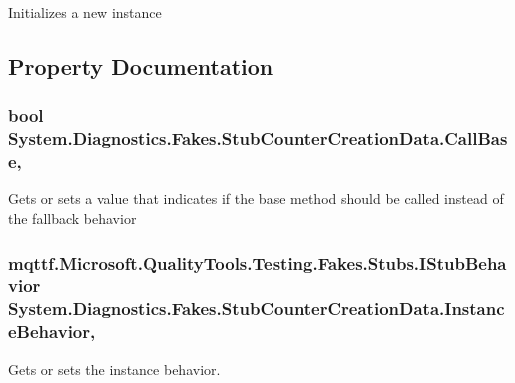 Initializes a new instance



\subsection{Property Documentation}
\hypertarget{class_system_1_1_diagnostics_1_1_fakes_1_1_stub_counter_creation_data_a24df646b543562717fc69981645f8bed}{
\subsubsection[{Call\-Base}]{\setlength{\rightskip}{0pt plus 5cm}bool System.\-Diagnostics.\-Fakes.\-Stub\-Counter\-Creation\-Data.\-Call\-Base\hspace{0.3cm}{\ttfamily [get]}, {\ttfamily [set]}}}\label{class_system_1_1_diagnostics_1_1_fakes_1_1_stub_counter_creation_data_a24df646b543562717fc69981645f8bed}


Gets or sets a value that indicates if the base method should be called instead of the fallback behavior

\hypertarget{class_system_1_1_diagnostics_1_1_fakes_1_1_stub_counter_creation_data_a2ae19c2896861a9368a53b0fdc99e121}{
\subsubsection[{Instance\-Behavior}]{\setlength{\rightskip}{0pt plus 5cm}mqttf.\-Microsoft.\-Quality\-Tools.\-Testing.\-Fakes.\-Stubs.\-I\-Stub\-Behavior System.\-Diagnostics.\-Fakes.\-Stub\-Counter\-Creation\-Data.\-Instance\-Behavior\hspace{0.3cm}{\ttfamily [get]}, {\ttfamily [set]}}}\label{class_system_1_1_diagnostics_1_1_fakes_1_1_stub_counter_creation_data_a2ae19c2896861a9368a53b0fdc99e121}


Gets or sets the instance behavior.

